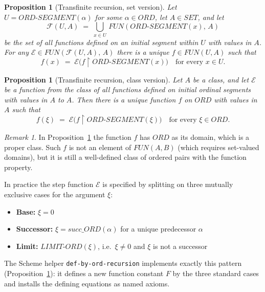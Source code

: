 \documentclass{amsbook}[openany]
\newtheorem{prop}[thm]{Proposition}
\theoremstyle{definition}
\theoremstyle{remark}
\newtheorem{remark}{Remark}[chapter]
\theoremstyle{remark}
\begin{document}
\begin{prop}[Transfinite recursion, set version]\label{prop:tfrec-set}
Let $U = \mathit{ORD\text{-}SEGMENT}(\alpha)$ for some $\alpha \in \mathit{ORD}$,
let $A \in \mathit{SET}$, and let
\[
  \mathcal{F}(U, A) \;=\; \bigcup_{x \in U}\,\mathit{FUN}(\mathit{ORD\text{-}SEGMENT}(x),\, A)
\]
be the set of all functions defined on an initial segment within $U$ with
values in $A$.  For any $\mathcal{E} \in \mathit{FUN}(\mathcal{F}(U,A),\, A)$ there
is a unique $f \in \mathit{FUN}(U, A)$ such that
\[
  f(x) \;=\; \mathcal{E}\bigl(f \!\restriction\! \mathit{ORD\text{-}SEGMENT}(x)\bigr)
  \quad \text{for every } x \in U.
\]
\end{prop}

\begin{prop}[Transfinite recursion, class version]\label{prop:tfrec-class}
Let $A$ be a class, and let $\mathcal{E}$ be a function from the class of
all functions defined on initial ordinal segments with values in $A$ to $A$.
Then there is a unique function $f$ on $\mathit{ORD}$ with values in $A$ such that
\[
  f(\xi) \;=\; \mathcal{E}\bigl(f \!\restriction\! \mathit{ORD\text{-}SEGMENT}(\xi)\bigr)
  \quad \text{for every } \xi \in \mathit{ORD}.
\]
\end{prop}

\begin{remark}
In Proposition~\ref{prop:tfrec-class} the function $f$ has $\mathit{ORD}$ as its
domain, which is a proper class.  Such $f$ is not an element of $\mathit{FUN}(A,B)$
(which requires set-valued domains), but it is still a well-defined class of
ordered pairs with the function property.
\end{remark}

In practice the step function $\mathcal{E}$ is specified by splitting on
three mutually exclusive cases for the argument $\xi$:
\begin{itemize}[label=$\circ$, leftmargin=0.9cm]
\item \textbf{Base:} $\xi = 0$
\item \textbf{Successor:} $\xi = \mathit{succ\_ORD}(\alpha)$ for a unique predecessor $\alpha$
\item \textbf{Limit:} $\mathit{LIMIT\text{-}ORD}(\xi)$, i.e.\ $\xi \neq 0$ and $\xi$ is not a successor
\end{itemize}

The Scheme helper \texttt{def-by-ord-recursion} implements exactly this
pattern (Proposition~\ref{prop:tfrec-class}): it defines a new function
constant $F$ by the three standard cases and installs the defining
equations as named axioms.
\end{document}

